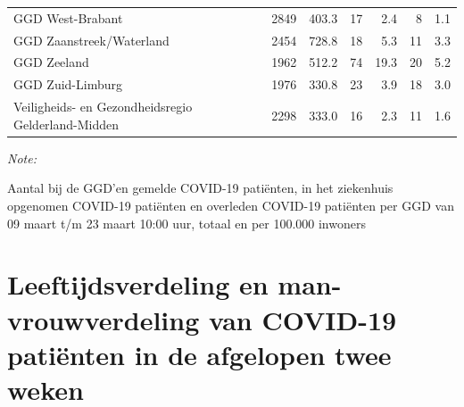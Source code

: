 \documentclass[
  english,
  man,floatsintext]{apa6}
\begin{document}
\begin{table}
\begin{threeparttable}
\begin{tabular}{lrrrrrr}
GGD West-Brabant & 2849 & 403.3 & 17 & 2.4 & 8 & 1.1\\
GGD Zaanstreek/Waterland & 2454 & 728.8 & 18 & 5.3 & 11 & 3.3\\
GGD Zeeland & 1962 & 512.2 & 74 & 19.3 & 20 & 5.2\\
GGD Zuid-Limburg & 1976 & 330.8 & 23 & 3.9 & 18 & 3.0\\
Veiligheids- en Gezondheidsregio Gelderland-Midden & 2298 & 333.0 & 16 & 2.3 & 11 & 1.6\\
\bottomrule
\end{tabular}
\begin{tablenotes}
\item \textit{Note: } 
\item Aantal bij de GGD’en gemelde COVID-19 patiënten, in het ziekenhuis opgenomen COVID-19 patiënten en overleden COVID-19 patiënten per GGD van 09 maart t/m 23 maart 10:00 uur, totaal en per 100.000 inwoners
\end{tablenotes}
\end{threeparttable}
\endgroup{}
\end{table}

\newpage

\hypertarget{leeftijdsverdeling-en-man-vrouwverdeling-van-covid-19-patiuxebnten-in-de-afgelopen-twee-weken}{%
\section{Leeftijdsverdeling en man-vrouwverdeling van COVID-19 patiënten in de afgelopen twee weken}\label{leeftijdsverdeling-en-man-vrouwverdeling-van-covid-19-patiuxebnten-in-de-afgelopen-twee-weken}}
\end{document}
